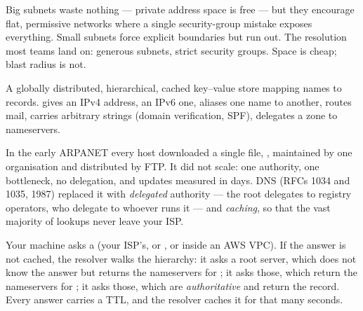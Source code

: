 \begin{tradeoff}
Big subnets waste nothing --- private address space is free --- but they encourage flat, permissive networks where a single security-group mistake exposes everything. Small subnets force explicit boundaries but run out. The resolution most teams land on: generous subnets, strict security groups. Space is cheap; blast radius is not.
\end{tradeoff}


 A globally distributed, hierarchical, cached key--value store mapping names to records.  gives an IPv4 address,  an IPv6 one,  aliases one name to another,  routes mail,  carries arbitrary strings (domain verification, SPF),  delegates a zone to nameservers.

 In the early ARPANET every host downloaded a single file, , maintained by one organisation and distributed by FTP. It did not scale: one authority, one bottleneck, no delegation, and updates measured in days. DNS (RFCs 1034 and 1035, 1987) replaced it with \emph{delegated} authority --- the root delegates  to registry operators, who delegate  to whoever runs it --- and \emph{caching}, so that the vast majority of lookups never leave your ISP.

 Your machine asks a  (your ISP's, or , or  inside an AWS VPC). If the answer is not cached, the resolver walks the hierarchy: it asks a root server, which does not know the answer but returns the nameservers for ; it asks those, which return the nameservers for ; it asks those, which are \emph{authoritative} and return the record. Every answer carries a TTL, and the resolver caches it for that many seconds.

